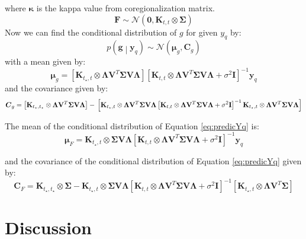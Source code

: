 where $\boldsymbol{\kappa}$ is the kappa value from coregionalization matrix.
\begin{equation} \label{eq:predictionF}
  \mathbf{F}  \sim \mathcal{N} \left( \mathbf{0},\mathbf{K}_{t,t} \otimes \boldsymbol{\Sigma}\right)
\end{equation}
Now we can find the conditional distribution of $g$ for given $y_q$ by:
\begin{equation}\label{eq:gGivenYq}
 p\left(\mathbf{g} \middle| \mathbf{y}_q\right) \sim 
    \mathcal{N} \left( \boldsymbol{\mu}_g, \mathbf{C}_g\right)
\end{equation}
with a mean given by:
\begin{equation} \label{eq:prediction_MuG}
  \boldsymbol{\mu}_g = 
    \left[ \mathbf{K}_{t_\star,t} \otimes \boldsymbol{\Lambda} \mathbf{V}^T\boldsymbol{\Sigma} \mathbf{V} \boldsymbol{\Lambda}  \right] 
    \left[ \mathbf{K}_{t,t} \otimes \boldsymbol{\Lambda} \mathbf{V}^T\boldsymbol{\Sigma} \mathbf{V} \boldsymbol{\Lambda} + \sigma^2 \mathbf{I} \right]^{-1}\mathbf{y}_q
\end{equation}
and the covariance given by:
\begin{equation} \label{eq:prediction_Cg}
\boldsymbol{C}_g = 
    \left[ \mathbf{K}_{t_\star,t_\star} \otimes \boldsymbol{\Lambda} \mathbf{V}^T\boldsymbol{\Sigma} \mathbf{V} \boldsymbol{\Lambda}  \right] - \\
    \left[ \mathbf{K}_{t_\star,t} \otimes \boldsymbol{\Lambda} \mathbf{V}^T\boldsymbol{\Sigma} \mathbf{V} \boldsymbol{\Lambda}  
    \left[ \mathbf{K}_{t,t} \otimes \boldsymbol{\Lambda} \mathbf{V}^T\boldsymbol{\Sigma} \mathbf{V} \boldsymbol{\Lambda} + \sigma^2 \mathbf{I} \right]^{-1} 
    \mathbf{K}_{t_\star,t} \otimes \boldsymbol{\Lambda} \mathbf{V}^T\boldsymbol{\Sigma} \mathbf{V} \boldsymbol{\Lambda} \right]
\end{equation}

The mean of the conditional distribution of Equation \ref{eq:predicYq} %
is:
\begin{equation} \label{eq:prediction_MuF}
  \boldsymbol{\mu}_F = 
    \mathbf{K}_{t_\star,t} \otimes \boldsymbol{\Sigma} \mathbf{V} \boldsymbol{\Lambda}
    \left[ \mathbf{K}_{t,t} \otimes \boldsymbol{\Lambda} \mathbf{V}^T\boldsymbol{\Sigma} \mathbf{V} \boldsymbol{\Lambda} + \sigma^2 \mathbf{I} \right]^{-1}\mathbf{y}_q
\end{equation}

and the covariance of the conditional distribution of Equation \ref{eq:predicYq} %
given by:
\begin{equation} \label{eq:prediction_CF}
  \boldsymbol{C}_F = 
    \mathbf{K}_{t_\star,t_\star} \otimes \boldsymbol{\Sigma} -
    \mathbf{K}_{t_\star,t} \otimes \boldsymbol{\Sigma}\mathbf{V} \boldsymbol{\Lambda}
    \left[ \mathbf{K}_{t,t} \otimes \boldsymbol{\Lambda} \mathbf{V}^T\boldsymbol{\Sigma} \mathbf{V} \boldsymbol{\Lambda} + \sigma^2 \mathbf{I} \right]^{-1} 
    \left[ \mathbf{K}_{t_\star,t} \otimes \boldsymbol{\Lambda} \mathbf{V}^T\boldsymbol{\Sigma}\right]
\end{equation}


\section{Discussion}
